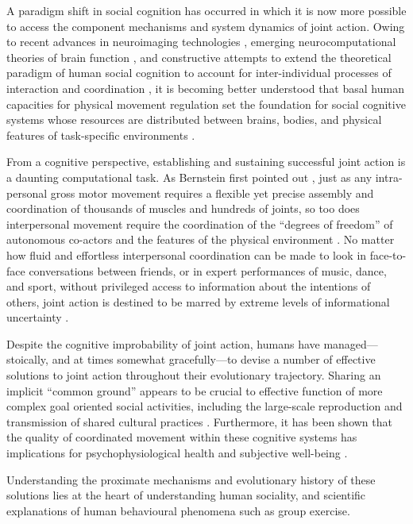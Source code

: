 \begin{CJK}{UTF8}{gbsn}
A paradigm shift in social cognition has occurred in which it is now more possible to access the component mechanisms and system dynamics of joint action.  Owing to recent advances in neuroimaging technologies \citep{Frith2007}, emerging neurocomputational theories of brain function \citep{Yufik2013,Friston2010,Frith2010,Clark2013}, and constructive attempts to extend the theoretical paradigm of human social cognition to account for inter-individual processes of interaction and coordination \citep{Sebanz2006,Dale2014}, it is becoming better understood that basal human capacities for physical movement regulation set the foundation for social cognitive systems whose resources are distributed between brains, bodies, and physical features of task-specific environments \citep{Hutchins2000,Kirsh2006,Semin2008,Semin2012,Coey2012}.

From a cognitive perspective, establishing and sustaining successful joint action is a daunting computational task.  As Bernstein first pointed out \textcite{Bernstein1967}, just as any intra-personal gross motor movement requires a flexible yet precise assembly and coordination of thousands of muscles and hundreds of joints, so too does interpersonal movement require the coordination of the ``degrees of freedom'' of autonomous co-actors and the features of the physical environment \citep{Riley2011}.  No matter how fluid and effortless interpersonal coordination can be made to look in face-to-face conversations between friends, or in expert performances of music, dance, and sport, without privileged access to information about the intentions of others, joint action is destined to be marred by extreme levels of informational uncertainty \citep{Sebanz2009}.

Despite the cognitive improbability of joint action, humans have managed---stoically, and at times somewhat gracefully---to devise a number of effective solutions to joint action throughout their evolutionary trajectory.  Sharing an implicit ``common ground'' appears to be crucial to effective function of more complex goal oriented social activities, including the large-scale reproduction and transmission of shared cultural practices \citep{Dunbar2012,Roepstorff2010,Claidiere2014,Launay2016}.  Furthermore, it has been shown that the quality of coordinated movement within these cognitive systems has implications for psychophysiological health and subjective well-being \citep{Wheatley2012}.

Understanding the proximate mechanisms and evolutionary history of these solutions lies at the heart of understanding human sociality, and scientific explanations of human behavioural phenomena such as group exercise.






\end{CJK}
